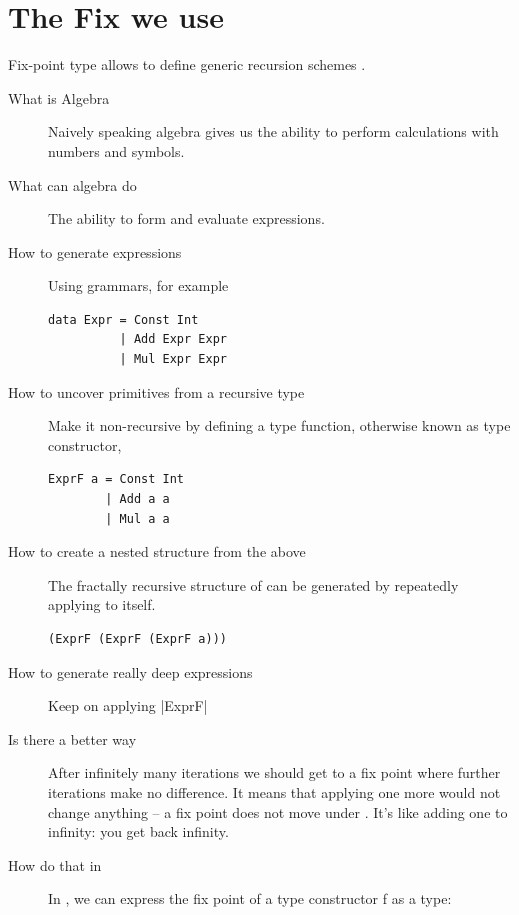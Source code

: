 \documentclass[thesis-solanki.tex]{subfiles}
\begin{document}
\section{The Fix we use}
Fix-point type allows to define generic recursion schemes \cite{data-fix-lib}.
\cite{website:understandingalgebrasfpcomplete}
\begin{description}
\item[What is Algebra]
Naively speaking algebra gives us the ability to perform calculations with numbers and symbols.

\item[What can algebra do]
The ability to form and evaluate expressions.

\item[How to generate expressions]
Using grammars, for example
\begin{verbatim}
data Expr = Const Int
          | Add Expr Expr
          | Mul Expr Expr
\end{verbatim}

\item[How to uncover primitives from a recursive type]
Make it non-recursive by defining a type function, otherwise known as type constructor,
\begin{verbatim}
ExprF a = Const Int
        | Add a a
        | Mul a a
\end{verbatim}

\item[How to create a nested structure from the above]
The fractally recursive structure of  can be generated by repeatedly applying  to itself.
\begin{verbatim}
(ExprF (ExprF (ExprF a)))
\end{verbatim}

\item[How to generate really deep expressions]
Keep on applying |ExprF|

\item[Is there a better way]
After infinitely many iterations we should get to a fix point where further iterations make no difference. It means that applying one more 
 would not change anything --
a fix point does not move under . It's like adding one to infinity: you get back infinity.   

\item[How do that in ]
In , we can express the fix point of a type constructor f as a type:


\end{description}
\end{document}
